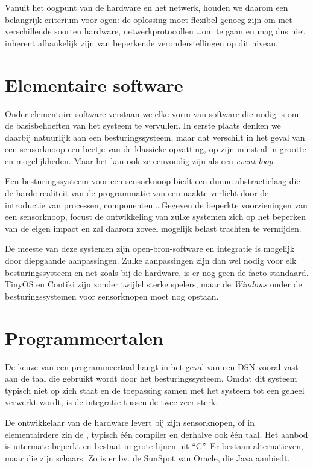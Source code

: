 Vanuit het oogpunt van de hardware en het netwerk, houden we daarom een
belangrijk criterium voor ogen: de oplossing moet flexibel genoeg zijn om met
verschillende soorten hardware, netwerkprotocollen \dots om te gaan en mag dus
niet inherent afhankelijk zijn van beperkende veronderstellingen op dit niveau.

\section{Elementaire software}
\label{section:solution-software}

Onder elementaire software verstaan we elke vorm van software die nodig is om
de basisbehoeften van het systeem te vervullen. In eerste plaats denken we
daarbij natuurlijk aan een besturingssysteem, maar dat verschilt in het geval
van een sensorknoop een beetje van de klassieke opvatting, op zijn minst al in
grootte en mogelijkheden. Maar het kan ook ze eenvoudig zijn als een
\emph{event loop}.

Een besturingssysteem voor een sensorknoop biedt een dunne abstractielaag die
de harde realiteit van de programmatie van een naakte \mcu verlicht door de
introductie van processen, componenten \dots Gegeven de beperkte voorzieningen
van een sensorknoop, focust de ontwikkeling van zulke systemen zich op het
beperken van de eigen impact en zal daarom zoveel mogelijk belast trachten te
vermijden.

De meeste van deze systemen zijn open-bron-software en integratie is mogelijk
door diepgaande aanpassingen. Zulke aanpassingen zijn dan wel nodig voor elk
besturingssysteem en net zoals bij de hardware, is er nog geen de facto
standaard. TinyOS en Contiki zijn zonder twijfel sterke spelers, maar de
\emph{Windows} onder de besturingssystemen voor sensorknopen moet nog opstaan.

\section{Programmeertalen}
\label{section:solution-proglang}

De keuze van een programmeertaal hangt in het geval van een DSN vooral vast aan
de taal die gebruikt wordt door het besturingssysteem. Omdat dit systeem
typisch niet op zich staat en de toepassing samen met het systeem tot een
geheel verwerkt wordt, is de integratie tussen de twee zeer sterk.

De ontwikkelaar van de hardware levert bij zijn sensorknopen, of in
elementairdere zin de \mcu, typisch \'e\'en compiler en derhalve ook \'e\'en
taal. Het aanbod is uitermate beperkt en bestaat in grote lijnen uit ``C''. Er
bestaan alternatieven, maar die zijn schaars. Zo is er bv. de SunSpot van
Oracle, die Java aanbiedt.


